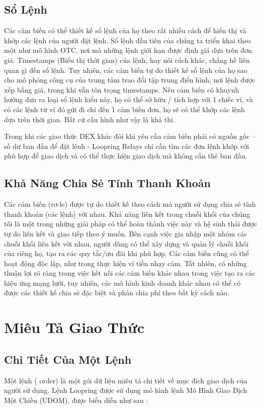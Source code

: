 \documentclass{article}
\begin{document}
\begin{multicols}{2}
\subsection{Sổ Lệnh\label{sec:order_book}}
Các cảm biến có thể thiết kế sổ lệnh của họ theo rất nhiều cách để hiển thị và khớp các lệnh của người đặt lệnh. Sổ lệnh đầu tiên của chúng ta triển khai theo một như mô hình OTC, nơi mà những lệnh giới hạn được định giá dựa trên đơn giá. Timestamps (Biểu thị thời gian) của lệnh, hay nói cách khác, chẳng hề liên quan gì đến sổ lệnh. Tuy nhiên, các cảm biến tự do thiết kế sổ lệnh của họ sao cho mô phỏng công cụ của trung tâm trao đổi tập trung điển hình, nơi lệnh được xếp bằng giá, trong khi vẫn tôn trọng timestamps. Nếu cảm biến có khuynh hướng đưa ra loại sổ lệnh kiểu này, họ có thể sở hữu /  tích hợp  với 1 chiếc ví, và có các lệnh từ ví đó gửi đi chỉ đến 1 cảm biến đơn, họ sẽ có thể khớp các lệnh dựa trên thời gian. Bất cứ cấu hình như vậy là khả thi.

Trong khi các giao thức DEX khác đôi khi yêu cầu cảm biến phải có nguồn gốc – số dư ban đầu để đặt lệnh - Loopring Relays chỉ cần tìm các đơn lệnh khớp với phù hợp để giao dịch và có thể thực hiện giao dịch mà không cần thẻ ban đầu.

\subsection{Khả Năng Chia Sẻ Tính Thanh Khoản\label{sec:liquidity_sharing}}
Các cảm biến (rơ-le) được tự do thiết kế theo cách mà người sử dụng chia sẻ tính thanh khoản (các lệnh) với nhau. Khả năng liên kết trong chuỗi khối của chúng tôi là một trong những giải pháp có thể hoàn thành việc này và hệ sinh thái được tự do liên kết và giao tiếp theo ý muốn. Bên cạnh việc gia nhập một nhóm các chuỗi khối liên kết với nhau, người dùng có thể xây dựng và quản lý chuỗi khối của riêng họ, tạo ra các quy tắc/ưu đãi khi phù hợp. Các cảm biến cũng có thể hoạt động độc lập, như trong thực hiện ví tiền nhạy cảm. Tất nhiên, có những thuận lợi rõ ràng trong việc kết nối các cảm biến khác nhau trong việc tạo ra các hiệu ứng mạng lưới, tuy nhiên, các mô hình kinh doanh khác nhau có thể có được các thiết kế chia sẻ đặc biệt và phân chia phí theo bất kỳ cách nào.


\section{Miêu Tả Giao Thức\label{sec:protocol}}

\subsection{Chi Tiết Của Một Lệnh\label{anatomy}}
Một lệnh ( order) là một gói dữ liệu miêu tả chi tiết về mục đích giao dịch của người sử dụng. Lệnh Loopring được sử dụng mô hình lệnh Mô Hình Giao Dịch Một Chiều (UDOM), được biểu diễn như sau :


\end{multicols}
\end{document}
